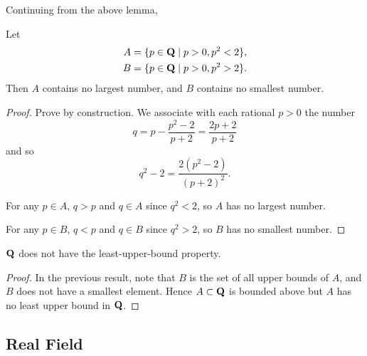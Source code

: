 Continuing from the above lemma,
\begin{lemma}
Let
\begin{align*}
A&=\{p\in\mathbf Q\mid p>0,p^2<2\},\\
B&=\{p\in\mathbf Q\mid p>0,p^2>2\}.
\end{align*}
Then $A$ contains no largest number, and $B$ contains no smallest number.
\end{lemma}

\begin{proof}
Prove by construction. We associate with each rational $p>0$ the number
\[q=p-\frac{p^2-2}{p+2}=\frac{2p+2}{p+2}\]
and so
\[q^2-2=\frac{2(p^2-2)}{(p+2)^2}.\]

For any $p\in A$, $q>p$ and $q\in A$ since $q^2<2$, so $A$ has no largest number.

For any $p\in B$, $q<p$ and $q\in B$ since $q^2>2$, so $B$ has no smallest number.
\end{proof}

\begin{proposition}
$\mathbf Q$ does not have the least-upper-bound property.
\end{proposition}

\begin{proof}
In the previous result, note that $B$ is the set of all upper bounds of $A$, and $B$ does not have a smallest element. Hence $A\subset\mathbf Q$ is bounded above but $A$ has no least upper bound in $\mathbf Q$.
\end{proof}

\subsection{Real Field}
\begin{comment}
\begin{definition}[Ordered field]
A field $F$ is an \vocab{ordered field} if there eists an order $<$ on $F$ such that for all $x,y,z\in F$,
\begin{enumerate}[label=(\roman*)]
\item if $y<z$ then $x+y<x+z$;
\item if $x>0$ and $y>0$ then $xy>0$.
\end{enumerate}
\end{definition}

\begin{proposition}[Basic properties]
The following statements are true in every ordered field.
\begin{enumerate}[label=(\roman*)]
\item If $x>0$ then $-x<0$, and vice versa.
\item If $x>0$ and $y<z$ then $xy<xz$.
\item If $x<0$ and $y<z$ then $xy>xz$.
\item If $x\neq0$ then $x^2>0$. In particular, $1>0$.
\item If $0<x<y$ then $0<\frac{1}{y}<\frac{1}{x}$.
\end{enumerate}
\end{proposition}
\end{comment}

